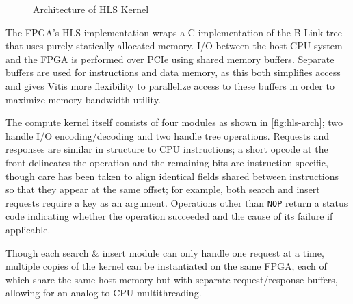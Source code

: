 \label{subsec:fpga-implementation}

\begin{figure}[H]
	\centering
	
	\caption{Architecture of HLS Kernel}
	\label{fig:hls-arch}
\end{figure}

The FPGA's HLS implementation wraps a C implementation of the B-Link tree that
uses purely statically allocated memory. I/O between the host CPU system and the
FPGA is performed over PCIe using shared memory buffers. Separate buffers are
used for instructions and data memory, as this both simplifies access and gives
Vitis more flexibility to parallelize access to these buffers in order to
maximize memory bandwidth utility.

The compute kernel itself consists of four modules as shown in
\autoref{fig:hls-arch}; two handle I/O encoding/decoding and two handle tree
operations. Requests and responses are similar in structure to CPU instructions;
a short opcode at the front delineates the operation and the remaining bits are
instruction specific, though care has been taken to align identical fields
shared between instructions so that they appear at the same offset; for example,
both search and insert requests require a key as an argument. Operations other
than \texttt{NOP} return a status code indicating whether the operation
succeeded and the cause of its failure if applicable.

Though each search \& insert module can only handle one request at a time,
multiple copies of the kernel can be instantiated on the same FPGA, each of
which share the same host memory but with separate request/response buffers,
allowing for an analog to CPU multithreading.
